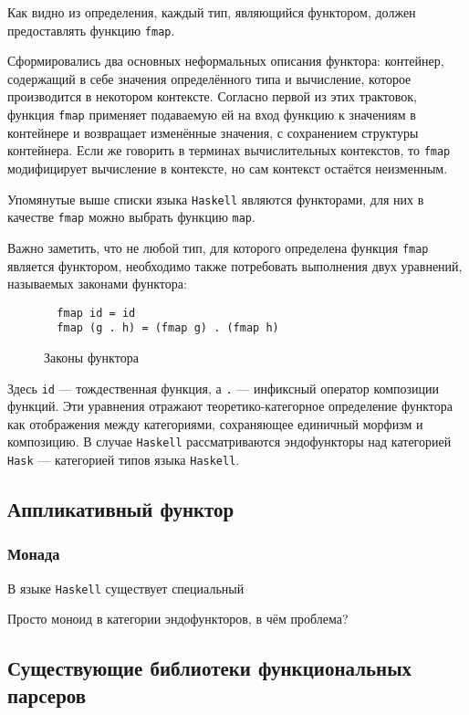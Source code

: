 Как видно из определения, каждый тип, являющийся функтором, должен предоставлять функцию \lstinline{fmap}.

Сформировались два основных неформальных описания функтора: контейнер, содержащий в себе значения определённого типа и вычисление, которое производится в некотором контексте. Согласно первой из этих трактовок, функция \lstinline{fmap} применяет подаваемую ей на вход функцию к значениям в контейнере и возвращает изменённые значения, с сохранением структуры контейнера. Если же говорить в терминах вычислительных контекстов, то \lstinline{fmap} модифицирует вычисление в контексте, но сам контекст остаётся неизменным.

Упомянутые выше списки языка \lstinline{Haskell} являются функторами, для них в качестве \lstinline{fmap} можно выбрать функцию \lstinline{map}. 

Важно заметить, что не любой тип, для которого определена функция \lstinline{fmap} является функтором, необходимо также потребовать выполнения двух уравнений, называемых законами функтора:

\begin{figure}[h]
\begin{lstlisting}
  fmap id = id
  fmap (g . h) = (fmap g) . (fmap h)
\end{lstlisting}
\caption{Законы функтора}
\label{listing:FunctorLaws}
\end{figure}

Здесь \lstinline{id} --- тождественная функция, а \lstinline{.} --- инфиксный оператор композиции функций. Эти уравнения отражают теоретико-категорное определение функтора как отображения между категориями, сохраняющее единичный морфизм и композицию. В случае \lstinline{Haskell} рассматриваются эндофункторы над категорией \lstinline{Hask} --- категорией типов языка \lstinline{Haskell}.  

\subsection{Аппликативный функтор}

\subsubsection{Монада}

В языке \lstinline{Haskell} существует специальный 

Просто моноид в категории эндофункторов, в чём проблема?  

\subsection{Существующие библиотеки функциональных парсеров}

